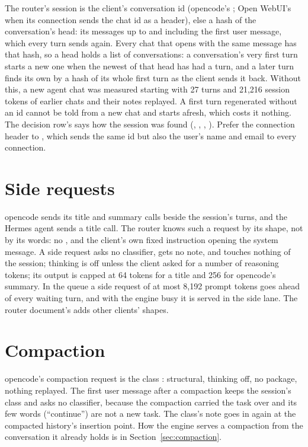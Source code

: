 \label{sec:router-session}The router's session is the client's conversation id (opencode's ; Open WebUI's  when its connection sends the chat id as a header), else a hash of the conversation's head: its messages up to and including the first user message, which every turn sends again. Every chat that opens with the same message has that hash, so a head holds a list of conversations: a conversation's very first turn starts a new one when the newest of that head has had a turn, and a later turn finds its own by a hash of its whole first turn as the client sends it back. Without this, a new agent chat was measured starting with 27 turns and 21,216 session tokens of earlier chats and their notes replayed. A first turn regenerated without an id cannot be told from a new chat and starts afresh, which costs it nothing. The decision row's  says how the session was found (, , , ). Prefer the connection header to , which sends the same id but also the user's name and email to every connection.

\section{Side requests}\label{sec:side-requests}

opencode sends its title and summary calls beside the session's turns, and the Hermes agent sends a title call. The router knows such a request by its shape, not by its words: no , and the client's own fixed instruction opening the system message. A side request asks no classifier, gets no note, and touches nothing of the session; thinking is off unless the client asked for a number of reasoning tokens; its output is capped at 64 tokens for a title and 256 for opencode's summary. In the queue a side request of at most 8,192 prompt tokens goes ahead of every waiting turn, and with the engine busy it is served in the side lane. The router document's  adds other clients' shapes.

\section{Compaction}

opencode's compaction request is the class : structural, thinking off, no package, nothing replayed. The first user message after a compaction keeps the session's class and asks no classifier, because the compaction carried the task over and its few words (\enquote{continue}) are not a new task. The class's note goes in again at the compacted history's insertion point. How the engine serves a compaction from the conversation it already holds is in Section~\ref{sec:compaction}.

